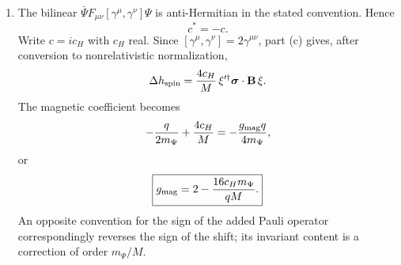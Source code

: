 \begin{enumerate}
\begin{enumerate}
\[ \left[(p'+p)^\mu+\gamma^{\mu\nu}(p'-p)_\nu\right]u(p).
\]
The first term gives the spin-independent convection current.  The
second term, integrated against a uniform background field, gives
\[
 \bra{\mathbf p',s'}H_I\ket{\mathbf p,s}
 =(2\pi)^3\delta^3(\mathbf p-\mathbf p')
 \left[
 -q\,\xi'^\dagger\boldsymbol\sigma\cdot\mathbf B\,\xi
 +\text{spin-independent terms}\right]
\]
for relativistically normalized one-particle states.  Dividing by
\(\sqrt{2\omega_{\mathbf p'}\,2\omega_{\mathbf p}}\to2m_\Psi\) gives the
nonrelativistic kernel
\[
 \boxed{
 h_{\rm spin}
 =-\frac{q}{2m_\Psi}
 \xi'^\dagger\boldsymbol\sigma\cdot\mathbf B\,\xi.}
\]
Thus
\[
 H_{\rm spin}
 =-\frac{q}{m_\Psi}\mathbf S\cdot\mathbf B
 =-g_{\rm mag}\frac{q}{2m_\Psi}\mathbf S\cdot\mathbf B,
 \qquad
 \boxed{g_{\rm mag}=2.}
\]
\item
The bilinear
\(\bar\Psi F_{\mu\nu}[\gamma^\mu,\gamma^\nu]\Psi\)
is anti-Hermitian in the stated convention.  Hence
\[
 \boxed{c^*=-c.}
\]
Write \(c=ic_H\) with \(c_H\) real.  Since
\([\gamma^\mu,\gamma^\nu]=2\gamma^{\mu\nu}\), part (c) gives, after
conversion to nonrelativistic normalization,
\[
 \Delta h_{\rm spin}
 =\frac{4c_H}{M}\,
 \xi'^\dagger\boldsymbol\sigma\cdot\mathbf B\,\xi.
\]
The magnetic coefficient becomes
\[
 -\frac{q}{2m_\Psi}+\frac{4c_H}{M}
 =-\frac{g_{\rm mag}q}{4m_\Psi},
\]
or
\[
 \boxed{
 g_{\rm mag}
 =2-\frac{16c_Hm_\Psi}{qM}.}
\]
An opposite convention for the sign of the added Pauli operator
correspondingly reverses the sign of the shift; its invariant content
is a correction of order \(m_\Psi/M\).
\end{enumerate}


\end{enumerate}
